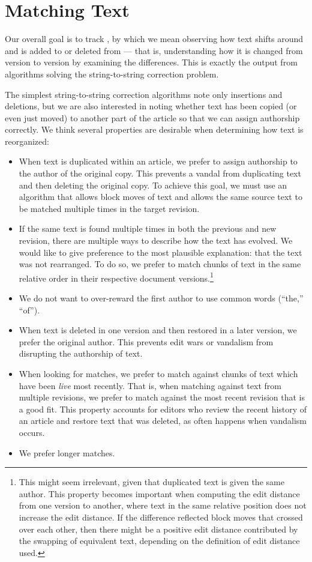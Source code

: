 \section{Matching Text}
\label{sec:diff-greedy}

Our overall goal is to track ,
by which we mean observing how text shifts
around and is added to or deleted from --- that is,
understanding how it is changed from version to version
by examining the differences.
This is exactly the output from algorithms solving the
string-to-string correction problem.

The simplest string-to-string correction algorithms
note only insertions and deletions, but we are also interested
in noting whether text has been copied (or even just moved)
to another part of the article so that we can assign authorship
correctly.
We think several properties are desirable
when determining how text is reorganized:
\begin{itemize}
\item When text is duplicated within an article, we prefer to assign
    authorship to the author of the original copy.
    This prevents a vandal from duplicating text and then deleting the
    original copy.
    To achieve this goal, we must use an algorithm that allows
    block moves of text and allows the same source text to be
    matched multiple times in the target revision.
\item If the same text is found multiple times in both the previous
    and new revision, there are multiple ways to describe how the
    text has evolved.
    We would like to give preference to the most plausible explanation:
    that the text was not rearranged.
    To do so, we prefer to match chunks of text in the
    same relative order in their respective document
    versions.\footnote{This might seem irrelevant, given that duplicated
    text is given the same author.  This property becomes important
    when computing the edit distance from one version to another,
    where text in the same relative position does not increase the
    edit distance.  If the difference reflected block moves that
    crossed over each other, then there might be a positive edit
    distance contributed by the swapping of equivalent text,
    depending on the definition of edit distance used.}
\item We do not want to over-reward the first author to use common
    words (\eg ``the,'' ``of'').
\item When text is deleted in one version and then restored in a later
    version, we prefer the original author.
    This prevents edit wars or vandalism from disrupting the
    authorship of text.
\item When looking for matches, we prefer to match against chunks
    of text which have been \textit{live} most recently.
    That is, when matching against text from multiple revisions,
    we prefer to match against the most recent revision that is
    a good fit.
    This property accounts for editors who review the recent history
    of an article and restore text that was deleted, as often happens
    when vandalism occurs.
\item We prefer longer matches.
\end{itemize}



